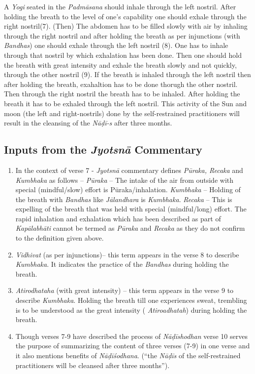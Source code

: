 A \textit{Yogi} seated in the \textit{Padmāsana} should inhale through the left nostril. After holding the breath to the level of one’s capability one should exhale through the right nostril(7). (Then) The abdomen has to be filled slowly with air by inhaling through the right nostril and after holding the breath as per injunctions (with  \textit{Bandhas}) one should exhale through the left nostril (8). One has to inhale through that nostril by which exhalation has been done. Then one should hold the breath with great intensity and exhale the breath slowly and not quickly, through the other nostril (9).  If the breath is inhaled through the left nostril then after holding the breath, exahaltion has to be done thorugh the other nostril. Then through the right nostril the breath has to be inhaled. After holding the breath it has to be exhaled through the left nostril. This activity of the Sun and moon (the left and right-nostrils) done by the self-restrained practitioners will result in the cleansing of the \textit{Nāḍī-s} after three months. 

\subsection*{Inputs from the \textit{Jyotsnā} Commentary}


\begin{enumerate}
\item In the context of verse 7 - \textit{Jyotsnā} commentary defines  \textit{Pūraka, Recaka} and \textit{Kumbhaka} as follows –  \textit{Pūraka} – The intake of the air from outside with special (mindful/slow) effort  is Pūraka/inhalation. \textit{Kumbhaka} – Holding of the breath with  \textit{Bandhas} like  \textit{Jālandhara} is \textit{Kumbhaka}.  \textit{Recaka} – This is expelling of the breath that was held with special (mindful/long) effort. The rapid inhalation and exhalation which has been described as part of \textit{Kapālabhāti} cannot be termed as  \textit{Pūraka} and \textit{Recaka} as they do not confirm to the definition given above. 
\item \textit{Vidhivat} (as per injunctions)– this term appears in the verse 8 to describe \textit{Kumbhaka}. It indicates the practice of the  \textit{Bandhas} during holding the breath. 
\item  \textit{Atirodhataha} (with great intensity) – this term appears in the verse 9 to describe \textit{Kumbhaka}. Holding the breath till one experiences sweat, trembling is to be understood as the great intensity ( \textit{Atiroadhatah}) during holding the breath.
\item Though verses 7-9 have described the process of \textit{Nāḍīshodhan} verse 10 serves the purpose of summarizing the content of three verses (7-9) in one verse and it also mentions benefits of \textit{Nāḍīśodhana}. (“the \textit{Nāḍīs} of the self-restrained practitioners will be cleansed after three months”). 
\end{enumerate}

